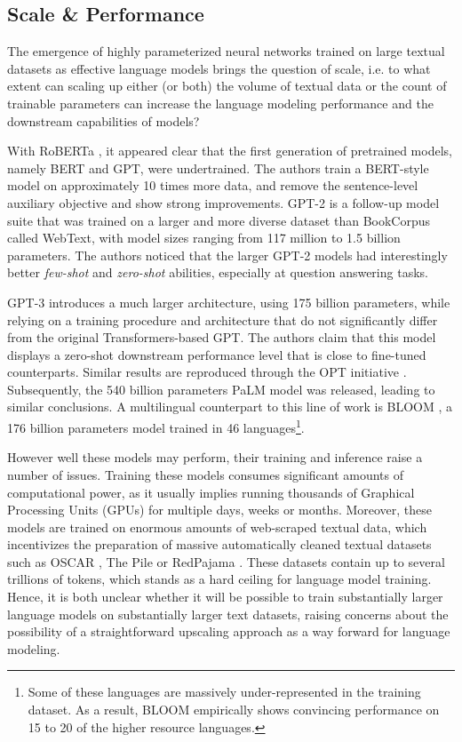\subsection{Scale \& Performance}
\label{ssec:scaling_law}
The emergence of highly parameterized neural networks trained on large textual datasets as effective language models brings the question of scale, i.e. to what extent can scaling up either (or both) the volume of textual data or the count of trainable parameters can increase the language modeling performance and the downstream capabilities of models?

With RoBERTa \citep{roberta}, it appeared clear that the first generation of pretrained models, namely BERT and GPT, were undertrained. The authors train a BERT-style model on approximately 10 times more data, and remove the sentence-level auxiliary objective and show strong improvements. GPT-2 \citep{gpt2} is a follow-up model suite that was trained on a larger and more diverse dataset than BookCorpus called WebText, with model sizes ranging from 117 million to 1.5 billion parameters. The authors noticed that the larger GPT-2 models had interestingly better \textit{few-shot} and \textit{zero-shot} abilities, especially at question answering tasks.

GPT-3 \citep{gpt3} introduces a much larger architecture, using 175 billion parameters, while relying on a training procedure and architecture that do not significantly differ from the original Transformers-based GPT. The authors claim that this model displays a zero-shot downstream performance level that is close to fine-tuned counterparts. Similar results are reproduced through the OPT initiative \citep{zhang2022opt}. Subsequently, the 540 billion parameters PaLM model \citep{palm} was released, leading to similar conclusions. A multilingual counterpart to this line of work is BLOOM \citep{le2023bloom}, a 176 billion parameters model trained in 46 languages\footnote{Some of these languages are massively under-represented in the training dataset. As a result, BLOOM empirically shows convincing performance on 15 to 20 of the higher resource languages.}.

However well these models may perform, their training and inference raise a number of issues. Training these models consumes significant amounts of computational power, as it usually implies running thousands of Graphical Processing Units (GPUs) for multiple days, weeks or months. Moreover, these models are trained on enormous amounts of web-scraped textual data, which incentivizes the preparation of massive automatically cleaned textual datasets such as OSCAR \citep{oscar}, The Pile \citep{gao2020pile} or RedPajama \citep{together2023redpajama}. These datasets contain up to several trillions of tokens, which stands as a hard ceiling for language model training. Hence, it is both unclear whether it will be possible to train substantially larger language models on substantially larger text datasets, raising concerns about the possibility of a straightforward upscaling approach as a way forward for language modeling.

